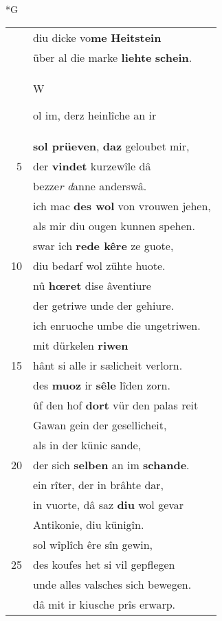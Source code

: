 \documentclass[8pt,a4paper,notitlepage]{article}
\begin{document}
\begin{table}[ht]
\begin{minipage}[t]{0.5\linewidth}
\small
\begin{center}*G
\end{center}
\begin{tabular}{rl}
 & diu dicke vo\textbf{me} \textbf{Heitstein}\\ 
 & über al die marke \textbf{liehte} \textbf{schein}.\\ 
 & \begin{large}W\end{large}ol im, derz heinlîche an ir\\ 
 & \textbf{sol prüeven}, \textbf{daz} geloubet mir,\\ 
5 & der \textbf{vindet} kurzewîle dâ\\ 
 & bezze\textit{r} \textit{d}anne anderswâ.\\ 
 & ich mac \textbf{des wol} von vrouwen jehen,\\ 
 & als mir diu ougen kunnen spehen.\\ 
 & swar ich \textbf{rede kêre} ze guote,\\ 
10 & diu bedarf wol zühte huote.\\ 
 & nû \textbf{hœret} dise âventiure\\ 
 & der getriwe unde der gehiure.\\ 
 & ich enruoche umbe die ungetriwen.\\ 
 & mit dürkelen \textbf{riwen}\\ 
15 & hânt si alle ir sælicheit verlorn.\\ 
 & des \textbf{muoz} ir \textbf{sêle} lîden zorn.\\ 
 & ûf den hof \textbf{dort} vür den palas reit\\ 
 & Gawan gein der gesellicheit,\\ 
 & als in der künic sande,\\ 
20 & der sich \textbf{selben} an im \textbf{schande}.\\ 
 & ein rîter, der in brâhte dar,\\ 
 & in vuorte, dâ saz \textbf{diu} wol gevar\\ 
 & Antikonie, diu künigîn.\\ 
 & sol wîplîch êre sîn gewin,\\ 
25 & des koufes het si vil gepflegen\\ 
 & unde alles valsches sich bewegen.\\ 
 & dâ mit ir kiusche prîs erwarp.\\ 

\end{tabular}
\end{minipage}
\end{table}
\end{document}
